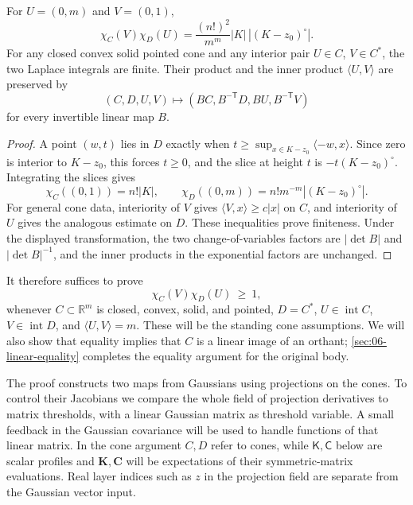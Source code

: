 \begin{lemma}\label{lem:cone-reduction}
For $U=(0,m)$ and $V=(0,1)$,
\[
\chi_C(V)\chi_D(U)=\frac{(n!)^2}{m^m}|K|\,|(K-z_0)^\circ|.
\]
For any closed convex solid pointed cone and any interior pair $U\in C$, $V\in C^*$, the two Laplace integrals are finite. Their product and the inner product $\langle U,V\rangle$ are preserved by
\[
(C,D,U,V)\longmapsto(BC,B^{-\mathsf T}D,BU,B^{-\mathsf T}V)
\]
for every invertible linear map $B$.
\end{lemma}
\begin{proof}
A point $(w,t)$ lies in $D$ exactly when $t\ge\sup_{x\in K-z_0}\langle-w,x\rangle$. Since zero is interior to $K-z_0$, this forces $t\ge0$, and the slice at height $t$ is $-t(K-z_0)^\circ$. Integrating the slices gives
\[
\chi_C((0,1))=n!|K|,\qquad
\chi_D((0,m))=n!m^{-m}|(K-z_0)^\circ|.
\]
For general cone data, interiority of $V$ gives $\langle V,x\rangle\ge c|x|$ on $C$, and interiority of $U$ gives the analogous estimate on $D$. These inequalities prove finiteness. Under the displayed transformation, the two change-of-variables factors are $|\det B|$ and $|\det B|^{-1}$, and the inner products in the exponential factors are unchanged.
\end{proof}

It therefore suffices to prove
\begin{equation}
             \chi_C(V)\chi_D(U)\ \ge\ 1,                            \label{eq:cone-laplace-product}
\end{equation}
whenever $C\subset\mathbb{R}^m$ is closed, convex, solid, and pointed, $D=C^*$, $U\in\operatorname{int}C$, $V\in\operatorname{int}D$, and $\langle U,V\rangle=m$. These will be the standing cone assumptions. We will also show that equality implies that $C$ is a linear image of an orthant; \cref{sec:06-linear-equality} completes the equality argument for the original body.

The proof constructs two maps from Gaussians using projections on the cones. To control their Jacobians we compare the whole field of projection derivatives to matrix thresholds, with a linear Gaussian matrix as threshold variable. A small feedback in the Gaussian covariance will be used to handle functions of that linear matrix. In the cone argument $C,D$ refer to cones, while $\mathsf K,\mathsf C$ below are scalar profiles and $\mathbf{K},\mathbf{C}$ will be expectations of their symmetric-matrix evaluations. Real layer indices such as $z$ in the projection field are separate from the Gaussian vector input.

